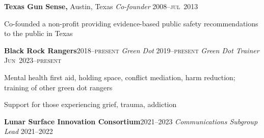 \documentclass[12pt,letterpaper]{article}
\newenvironment{itemize*}%
{\begin{itemize}%
  \setlength{\itemsep}{0pt}}%
{\end{itemize}}
\newcommand{\rdate}[1]{{\hfill #1}}
\begin{document}
\medskip
\textbf{Texas Gun Sense,} Austin, Texas \newline
\emph{Co-founder} \rdate{2008--\textsc{jul}~2013}
\begin{itemize*}
   \item Co-founded a non-profit providing evidence-based public safety recommendations to the public in Texas
\end{itemize*}


\medskip
\textbf{Black Rock Rangers}\rdate{2018--\textsc{present}}\newline
\emph{Green Dot} \rdate{2019--\textsc{present}} \newline
\emph{Green Dot Trainer} \rdate{\textsc{Jun}~2023--\textsc{present}}
\begin{itemize*}
  \item Mental health first aid, holding space, conflict mediation, harm reduction; training of other green dot rangers
  \item Support for those experiencing grief, trauma, addiction
\end{itemize*}

\medskip
\textbf{Lunar Surface Innovation Consortium}\rdate{2021--2023}\newline
\emph{Communications Subgroup Lead} \rdate{2021--2022}
\end{document}
